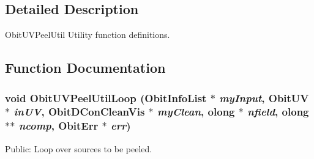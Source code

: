 \subsection{Detailed Description}
Obit\-UVPeel\-Util Utility function definitions. 



\subsection{Function Documentation}
\subsubsection{\setlength{\rightskip}{0pt plus 5cm}void Obit\-UVPeel\-Util\-Loop ({\bf Obit\-Info\-List} $\ast$ {\em my\-Input}, {\bf Obit\-UV} $\ast$ {\em in\-UV}, {\bf Obit\-DCon\-Clean\-Vis} $\ast$ {\em my\-Clean}, {\bf olong} $\ast$ {\em nfield}, {\bf olong} $\ast$$\ast$ {\em ncomp}, {\bf Obit\-Err} $\ast$ {\em err})}\label{ObitUVPeelUtil_8c_a0}


Public: Loop over sources to be peeled. 

